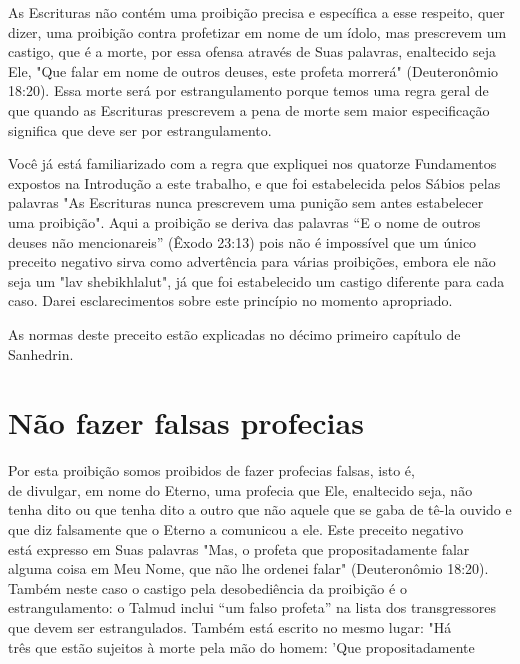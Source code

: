 As Escrituras não contém uma proibição precisa e específica a esse
respeito, quer dizer, uma proibição contra profetizar em nome de um
ídolo, mas prescrevem um castigo, que é a morte, por essa ofensa através
de Suas pa­lavras, enaltecido seja Ele, "Que falar em nome de outros
deuses, este profeta morrerá" (Deuteronômio 18:20). Essa morte será por
estrangulamento porque temos uma regra geral de que quando as Escrituras
prescrevem a pena de mor­te sem maior especificação significa que deve
ser por estrangulamento.

Você já está familiarizado com a regra que expliquei nos quatorze
Fundamentos expostos na Introdução a este trabalho, e que foi
estabelecida pelos Sábios pelas palavras "As Escrituras nunca prescrevem
uma punição sem antes estabelecer uma proibição". Aqui a proibição se
deriva das palavras ``E o nome de outros deuses não mencionareis'' (Êxodo
23:13) pois não é impossí­vel que um único preceito negativo sirva como
advertência para várias proibi­ções, embora ele não seja um "lav
shebikhlalut", já que foi estabelecido um castigo diferente para cada
caso. Darei esclarecimentos sobre este princípio no momento apropriado.

As normas deste preceito estão explicadas no décimo primeiro capí­tulo
de Sanhedrin.

\section{Não fazer falsas profecias}

Por esta proibição somos proibidos de fazer profecias falsas, isto é,\\
de divulgar, em nome do Eterno, uma profecia que Ele, enaltecido seja,
não\\
tenha dito ou que tenha dito a outro que não aquele que se gaba de tê-la
ouvido
e que diz falsamente que o Eterno a comunicou a ele. Este preceito
negativo\\
está expresso em Suas palavras "Mas, o profeta que propositadamente
falar alguma
coisa em Meu Nome, que não lhe ordenei falar" (Deuteronômio
18:20).\\
Também neste caso o castigo pela desobediência da proibição é o\\
estrangulamento: o Talmud inclui ``um falso profeta'' na lista dos
transgressores
que devem ser estrangulados. Também está escrito no mesmo lugar:
"Há\\
três que estão sujeitos à morte pela mão do homem: 'Que propositadamente


